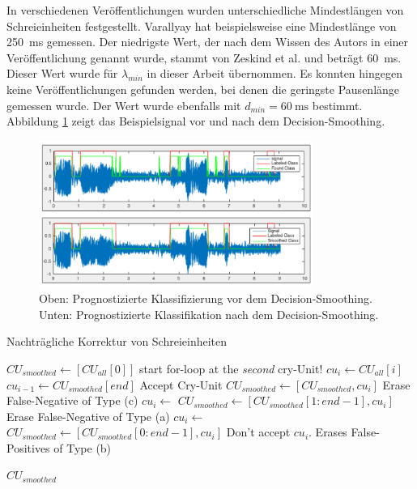 In verschiedenen Veröffentlichungen wurden unterschiedliche Mindestlängen von Schreieinheiten festgestellt. Varallyay \cite[S. 8]{cry_thesis} hat beispielsweise eine Mindestlänge von \SI{250}{\milli\second} gemessen. Der niedrigste Wert, der nach dem Wissen des Autors in einer Veröffentlichung genannt wurde, stammt von Zeskind et al. \cite[S. 325]{rythmic} und beträgt  \SI{60}{\milli\second}. Dieser Wert wurde für $\lambda_{min}$ in dieser Arbeit übernommen. Es konnten hingegen keine Veröffentlichungen gefunden werden, bei denen die geringste Pausenlänge gemessen wurde. Der Wert wurde ebenfalls mit $d_{min} = \SI{60}{\milli\second}$ bestimmt. Abbildung \ref{img:after-smoothing} zeigt das Beispielsignal vor und nach dem Decision-Smoothing. 

\begin{figure}[h]
	\centering
	\includegraphics[width=0.8\textwidth]{bilder/smoothing04.png}
	\caption[Klassifizierung nach dem Decision-Smoothing]{Oben: Prognostizierte Klassifizierung vor dem Decision-Smoothing. Unten: Prognostizierte Klassifikation nach dem Decision-Smoothing.}
	\label{img:after-smoothing}
\end{figure}

\begin{algorithm}[h]
	\caption{Nachträgliche Korrektur von Schreieinheiten}
	\label{alg:decisionSmoothing}
	\begin{algorithmic}[1]
		\State $CU_{smoothed} \gets[CU_{all}[0]] $
		\State \Comment start for-loop at the \emph{second} cry-Unit!
			\State $cu_i \gets CU_{all}[i]$
			\State $cu_{i-1} \gets CU_{smoothed}[end]$
			\State \Comment Accept Cry-Unit
					\State $CU_{smoothed} \gets [CU_{smoothed}, cu_i] $
			\Else
					\State \Comment Erase False-Negative of Type (c)
					\State $cu_i \gets $ 
					\State $CU_{smoothed} \gets [CU_{smoothed}[1:end-1], cu_i] $
			\EndIf
			\Else
			\State \Comment Erase False-Negative of Type (a)
			\State $cu_i \gets $ 
			\State $CU_{smoothed} \gets [CU_{smoothed}[0:end-1], cu_i] $
			\Else
			\State \Comment Don't accept $cu_i$. Erases False-Positives of Type (b)
			\EndIf
			\EndIf
		\EndFor
		
		\Return $CU_{smoothed}$
		\EndFunction
		
	\end{algorithmic}
\end{algorithm}



